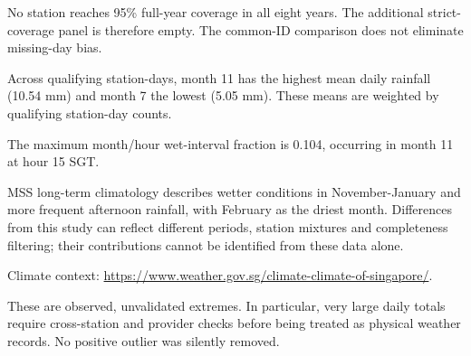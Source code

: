 \documentclass[11pt,a4paper]{article}
\begin{document}
No station reaches 95\% full-year coverage in all eight years. The additional strict-coverage panel is therefore empty. The common-ID comparison does not eliminate missing-day bias.

Across qualifying station-days, month 11 has the highest mean daily rainfall (10.54 mm) and month 7 the lowest (5.05 mm). These means are weighted by qualifying station-day counts.

The maximum month/hour wet-interval fraction is 0.104, occurring in month 11 at hour 15 SGT.

MSS long-term climatology describes wetter conditions in November-January and more frequent afternoon rainfall, with February as the driest month. Differences from this study can reflect different periods, station mixtures and completeness filtering; their contributions cannot be identified from these data alone.

Climate context: \url{https://www.weather.gov.sg/climate-climate-of-singapore/}.
\begin{table}[H]\centering\small
\caption{Largest qualifying station-day totals, requiring further quality checks}
\end{table}
These are observed, unvalidated extremes. In particular, very large daily totals require cross-station and provider checks before being treated as physical weather records. No positive outlier was silently removed.
\end{document}
